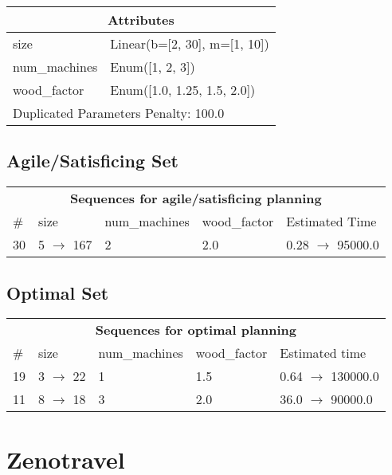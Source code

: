 \documentclass{article}
\begin{document}
                    \begin{center}
                    \begin{tabular}{p{}p{}}
                    \multicolumn{2}{c}{\bf \large Attributes}\\\midrule
                    size & Linear(b=[2, 30], m=[1, 10])\\
num\_machines & Enum([1, 2, 3])\\
wood\_factor & Enum([1.0, 1.25, 1.5, 2.0])
                    
                     \\\midrule
                    \multicolumn{2}{l}{Duplicated Parameters Penalty: 100.0}
                    \end{tabular}
                    \end{center}
                
                         \subsection*{Agile/Satisficing Set}

                        \begin{center}
                        \begin{tabular}{l|l|l|l|l}
                        \multicolumn{5}{c}{\bf \large Sequences for agile/satisficing planning}\\
                        \# & size & num\_machines & wood\_factor & Estimated Time\\\midrule
                        30&5 $\rightarrow$ 167&2&2.0&0.28 $\rightarrow$ 95000.0
                        \end{tabular}
                        \end{center}
                    
                            \subsection*{Optimal Set}

                            \begin{center}
                            \begin{tabular}{l|l|l|l|l}
                            \multicolumn{5}{c}{\bf \large Sequences for optimal planning}\\
                            \# & size & num\_machines & wood\_factor & Estimated time\\\midrule
                            19&3 $\rightarrow$ 22&1&1.5&0.64 $\rightarrow$ 130000.0\\
11&8 $\rightarrow$ 18&3&2.0&36.0 $\rightarrow$ 90000.0
                            \end{tabular}
                            \end{center}
                    \newpage \section{Zenotravel}
\end{document}
